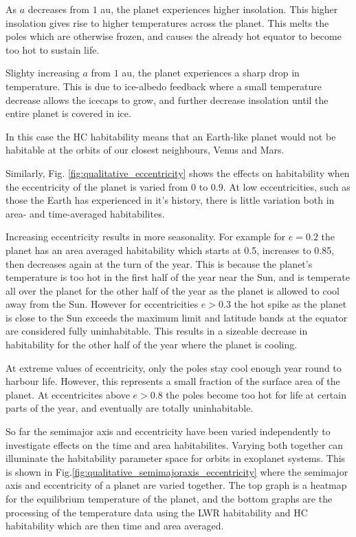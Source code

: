 \documentclass[12pt, onecolumn]{revtex4-2}    %
\begin{document}
As $a$ decreases from $1$ au, the planet experiences higher insolation.
This higher insolation gives rise to higher temperatures across the planet.
This melts the poles which are otherwise frozen, and causes the already hot equator to become too hot to sustain life.

Slighty increasing $a$ from $1$ au, the planet experiences a sharp drop in temperature.
This is due to ice-albedo feedback where a small temperature decrease allows the icecaps to grow, and further decrease insolation until the entire planet is covered in ice.

In this case the HC habitability means that an Earth-like planet would not be habitable at the orbits of our closest neighbours, Venus and Mars.


Similarly, Fig. \ref{fig:qualitative_eccentricity} shows the effects on habitability when the eccentricity of the planet is varied from $0$ to $0.9$.
At low eccentricities, such as those the Earth has experienced in it's history, there is little variation both in area- and time-averaged habitabilites.

Increasing eccentricity results in more seasonality.
For example for $e=0.2$ the planet has an area averaged habitability which starts at 0.5, increases to 0.85, then decreases again at the turn of the year.
This is because the planet's temperature is too hot in the first half of the year near the Sun, and is temperate all over the planet for the other half of the year as the planet is allowed to cool away from the Sun.
However for eccentricities $e>0.3$ the hot spike as the planet is close to the Sun exceeds the maximum limit and latitude bands at the equator are considered fully uninhabitable.
This results in a sizeable decrease in habitability for the other half of the year where the planet is cooling.

At extreme values of eccentricity, only the poles stay cool enough year round to harbour life.
However, this represents a small fraction of the surface area of the planet.
At eccentricites above $e > 0.8$ the poles become too hot for life at certain parts of the year, and eventually are totally uninhabitable.


So far the semimajor axis and eccentricity have been varied independently to investigate effects on the time and area habitabilites.
Varying both together can illuminate the habitability parameter space for orbits in exoplanet systems.
This is shown in Fig.\ref{fig:qualitative_semimajoraxis_eccentricity} where the semimajor axis and eccentricity of a planet are varied together.
The top graph is a heatmap for the equilibrium temperature of the planet, and the bottom graphs are the processing of the temperature data using the LWR habitability and HC habitability which are then time and area averaged.
\end{document}
